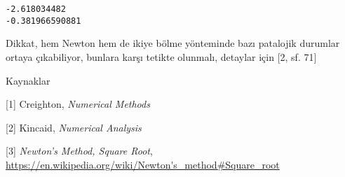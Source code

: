 \documentclass[12pt,fleqn]{article}\usepackage{../../common}
\begin{document}
\begin{verbatim}
-2.618034482
-0.381966590881
\end{verbatim}

Dikkat, hem Newton hem de ikiye bölme yönteminde bazı patalojik durumlar
ortaya çıkabiliyor, bunlara karşı tetikte olunmalı, detaylar için [2, sf. 71]

Kaynaklar 

[1] Creighton, {\em Numerical Methods}

[2] Kincaid, {\em Numerical Analysis}

[3] {\em Newton's Method, Square Root},
    \url{https://en.wikipedia.org/wiki/Newton's_method#Square_root}
\end{document}
